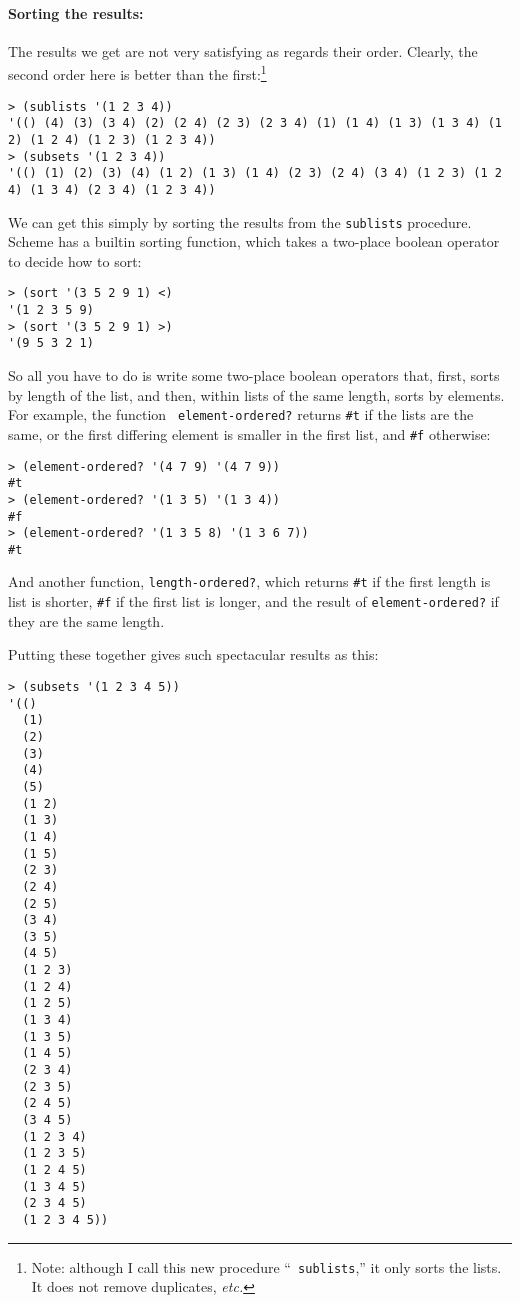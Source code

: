 \documentclass{article}
\begin{document}
\paragraph{Sorting the results:}
The results we get are not very satisfying as regards their order.
Clearly, the second order here is better than the
first:\footnote{Note: although I call this new procedure ``{\tt
    sublists},'' it only sorts the lists.  It does not remove
  duplicates, {\em etc.}}
{\small
  \begin{Verbatim}[frame=single]
> (sublists '(1 2 3 4))
'(() (4) (3) (3 4) (2) (2 4) (2 3) (2 3 4) (1) (1 4) (1 3) (1 3 4) (1 2) (1 2 4) (1 2 3) (1 2 3 4))
> (subsets '(1 2 3 4))
'(() (1) (2) (3) (4) (1 2) (1 3) (1 4) (2 3) (2 4) (3 4) (1 2 3) (1 2 4) (1 3 4) (2 3 4) (1 2 3 4))
\end{Verbatim}
}
We can get this simply by sorting the results from the {\tt sublists}
procedure.  Scheme has a builtin sorting function, which takes a
two-place boolean operator to decide how to sort:
\begin{Verbatim}[frame=single]
> (sort '(3 5 2 9 1) <)
'(1 2 3 5 9)
> (sort '(3 5 2 9 1) >)
'(9 5 3 2 1)
\end{Verbatim}
So all you have to do is write some two-place boolean operators that,
first, sorts by length of the list, and then, within lists of the same
length, sorts by elements.  For example, the function {\tt
  element-ordered?} returns \verb|#t| if the lists are the same, or
the first differing element is smaller in the first list, and
\verb|#f| otherwise:
\begin{Verbatim}[frame=single]
> (element-ordered? '(4 7 9) '(4 7 9))
#t
> (element-ordered? '(1 3 5) '(1 3 4))
#f
> (element-ordered? '(1 3 5 8) '(1 3 6 7))
#t
\end{Verbatim}
And another function, {\tt length-ordered?}, which returns \verb|#t|
if the first length is list is shorter, \verb|#f| if the first list is
longer, and the result of {\tt element-ordered?} if they are the same
length. 

Putting these together gives such spectacular results as this:
{\scriptsize
  \begin{Verbatim}[frame=single]
> (subsets '(1 2 3 4 5))
'(()
  (1)
  (2)
  (3)
  (4)
  (5)
  (1 2)
  (1 3)
  (1 4)
  (1 5)
  (2 3)
  (2 4)
  (2 5)
  (3 4)
  (3 5)
  (4 5)
  (1 2 3)
  (1 2 4)
  (1 2 5)
  (1 3 4)
  (1 3 5)
  (1 4 5)
  (2 3 4)
  (2 3 5)
  (2 4 5)
  (3 4 5)
  (1 2 3 4)
  (1 2 3 5)
  (1 2 4 5)
  (1 3 4 5)
  (2 3 4 5)
  (1 2 3 4 5))
\end{Verbatim}
}
\end{document}
